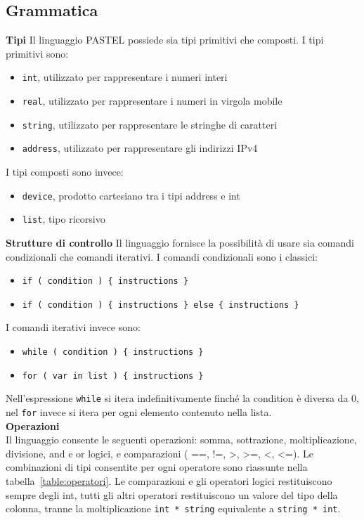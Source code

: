 \documentclass[10pt]{article}
\begin{document}
\subsection{Grammatica}

\textbf{Tipi}
Il linguaggio PASTEL possiede sia tipi primitivi che composti. I tipi primitivi sono:
\begin{itemize}
\item \texttt{int}, utilizzato per rappresentare i numeri interi
\item \texttt{real}, utilizzato per rappresentare i numeri in virgola mobile
\item \texttt{string}, utilizzato per rappresentare le stringhe di caratteri
\item \texttt{address}, utilizzato per rappresentare gli indirizzi IPv4
\end{itemize}

I tipi composti sono invece:
\begin{itemize}
\item \texttt{device}, prodotto cartesiano tra i tipi address e int 
\item \texttt{list}, tipo ricorsivo 
\end{itemize}

\clearpage
\textbf{Strutture di controllo}
Il linguaggio fornisce la possibilità di usare sia comandi condizionali che comandi iterativi. I comandi condizionali sono i classici:
\begin{itemize}
\item \texttt{if ( condition ) \{ instructions \}}
\item \texttt{if ( condition ) \{ instructions \} else \{ instructions \}}
\end{itemize}
I comandi iterativi invece sono:
\begin{itemize}
\item \texttt{while ( condition ) \{ instructions \}}
\item \texttt{for ( var in list ) \{ instructions \} }
\end{itemize}
Nell'espressione \texttt{while} si itera indefinitivamente finché la condition è diversa da 0, nel \texttt{for} invece si itera per ogni elemento contenuto nella lista.\\

\textbf{Operazioni}\\
Il linguaggio consente le seguenti operazioni: somma, sottrazione, moltiplicazione, divisione, and e or logici, e comparazioni ( ==, !=, >, >=, <, <=). Le combinazioni di tipi consentite per ogni operatore sono riassunte nella tabella~\ref{table:operatori}. Le comparazioni e gli operatori logici restituiscono sempre degli int, tutti gli altri operatori restituiscono un valore del tipo della colonna, tranne la moltiplicazione \texttt{int * string} equivalente a \texttt{string * int}. \\
\end{document}
